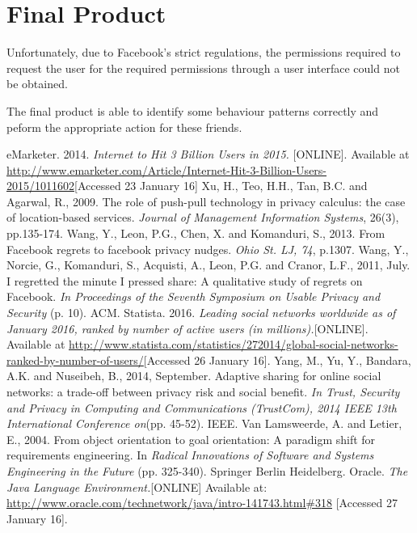 \documentclass[a4paper,11pt]{article}
\begin{document}
\section{Final Product}

Unfortunately, due to Facebook's strict regulations, the permissions required to request the user for the required permissions through a user interface could not be obtained. 

The final product is able to identify some behaviour patterns correctly and peform the appropriate action for these friends. 



\begin{thebibliography}{9}
eMarketer. 2014. 
\emph{Internet to Hit 3 Billion Users in 2015.} [ONLINE]. Available at
\url{http://www.emarketer.com/Article/Internet-Hit-3-Billion-Users-2015/1011602}[Accessed 23 January 16]
	Xu, H., Teo, H.H., Tan, B.C. and Agarwal, R., 2009.
	The role of push-pull technology in privacy calculus: the case of location-based services.
	\emph{Journal of Management Information Systems},
	26(3), pp.135-174. 
	Wang, Y., Leon, P.G., Chen, X. and Komanduri, S., 2013. From Facebook regrets to facebook privacy nudges.
	\emph{Ohio St. LJ, 74}, p.1307.
	Wang, Y., Norcie, G., Komanduri, S., Acquisti, A., Leon, P.G. and Cranor, L.F., 2011, July. I regretted the minute I pressed share: A qualitative study of regrets on Facebook. 
	\emph{In Proceedings of the Seventh Symposium on Usable Privacy and Security} (p. 10). ACM.
	Statista. 2016. 
	\emph{Leading social networks worldwide as of January 2016, ranked by number of active users (in millions).}[ONLINE]. 				Available at \url{http://www.statista.com/statistics/272014/global-social-networks-ranked-by-number-of-users/}[Accessed 26
	January 16].
	Yang, M., Yu, Y., Bandara, A.K. and Nuseibeh, B., 2014, September. 
	Adaptive sharing for online social networks: a trade-off between privacy risk and social benefit.
	\emph{In Trust, Security and Privacy in Computing and Communications (TrustCom), 2014 IEEE 13th International Conference on}(pp. 45-52). IEEE.
	Van Lamsweerde, A. and Letier, E., 2004. From object orientation to goal orientation: A paradigm shift for requirements engineering. In \emph{Radical Innovations of Software and Systems Engineering in the Future} (pp. 325-340). Springer Berlin Heidelberg.
	 Oracle.
	\emph{The Java Language Environment.}[ONLINE] Available at: 			\url{http://www.oracle.com/technetwork/java/intro-141743.html\#318} [Accessed 27 January 16].

\end{thebibliography}
\end{document}
